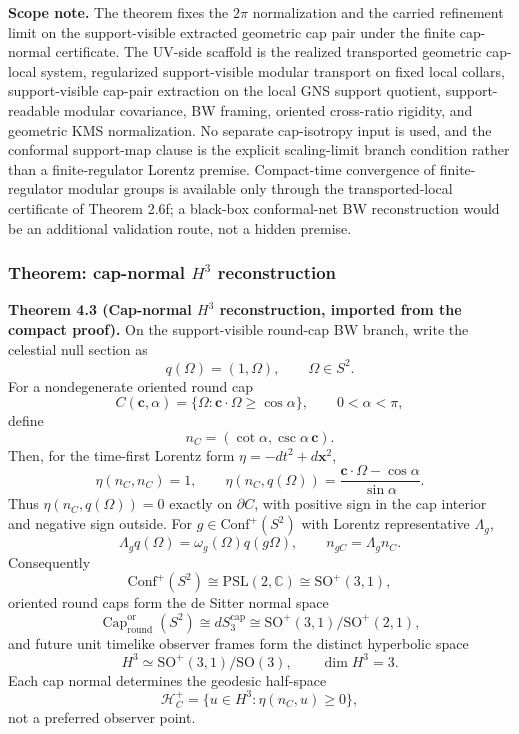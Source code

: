 \textbf{Scope note.} The theorem fixes the \(2\pi\) normalization and the carried refinement limit on the support-visible extracted geometric cap pair under the finite cap-normal certificate. The UV-side scaffold is the realized transported geometric cap-local system, regularized support-visible modular transport on fixed local collars, support-visible cap-pair extraction on the local GNS support quotient, support-readable modular covariance, BW framing, oriented cross-ratio rigidity, and geometric KMS normalization. No separate cap-isotropy input is used, and the conformal support-map clause is the explicit scaling-limit branch condition rather than a finite-regulator Lorentz premise. Compact-time convergence of finite-regulator modular groups is available only through the transported-local certificate of Theorem 2.6f; a black-box conformal-net BW reconstruction would be an additional validation route, not a hidden premise.
\subsubsection{\texorpdfstring{Theorem: cap-normal \(H^3\) reconstruction}{4.3 Theorem: cap-normal H3 reconstruction}}\label{43-theorem-mathrmbw_s2-implies-lorentz-kinematics}

\textbf{Theorem 4.3 (Cap-normal \(H^3\) reconstruction, imported from the compact proof).}
On the support-visible round-cap BW branch, write the celestial null section as
\[
q(\Omega)=(1,\Omega),\qquad \Omega\in S^2.
\]
For a nondegenerate oriented round cap
\[
C(\mathbf c,\alpha)=\{\Omega:\mathbf c\cdot\Omega\geq\cos\alpha\},
\qquad 0<\alpha<\pi,
\]
define
\[
n_C=(\cot\alpha,\csc\alpha\,\mathbf c).
\]
Then, for the time-first Lorentz form \(\eta=-dt^2+d\mathbf x^2\),
\[
\eta(n_C,n_C)=1,
\qquad
\eta(n_C,q(\Omega))
=
\frac{\mathbf c\cdot\Omega-\cos\alpha}{\sin\alpha}.
\]
Thus \(\eta(n_C,q(\Omega))=0\) exactly on \(\partial C\), with positive
sign in the cap interior and negative sign outside. For
\(g\in\mathrm{Conf}^+(S^2)\) with Lorentz representative \(\Lambda_g\),
\[
\Lambda_gq(\Omega)=\omega_g(\Omega)q(g\Omega),
\qquad
n_{gC}=\Lambda_gn_C.
\]
Consequently
\[
\mathrm{Conf}^+(S^2)\cong \mathrm{PSL}(2,\mathbb C)\cong \mathrm{SO}^+(3,1),
\]
oriented round caps form the de Sitter normal space
\[
\operatorname{Cap}^{\mathrm{or}}_{\mathrm{round}}(S^2)
\cong
dS_3^{\mathrm{cap}}
\cong
\mathrm{SO}^+(3,1)/\mathrm{SO}^+(2,1),
\]
and future unit timelike observer frames form the distinct hyperbolic space
\[
H^3\simeq \mathrm{SO}^+(3,1)/\mathrm{SO}(3),
\qquad
\dim H^3=3.
\]
Each cap normal determines the geodesic half-space
\[
\mathcal H_C^+=\{u\in H^3:\eta(n_C,u)\geq0\},
\]
not a preferred observer point.

